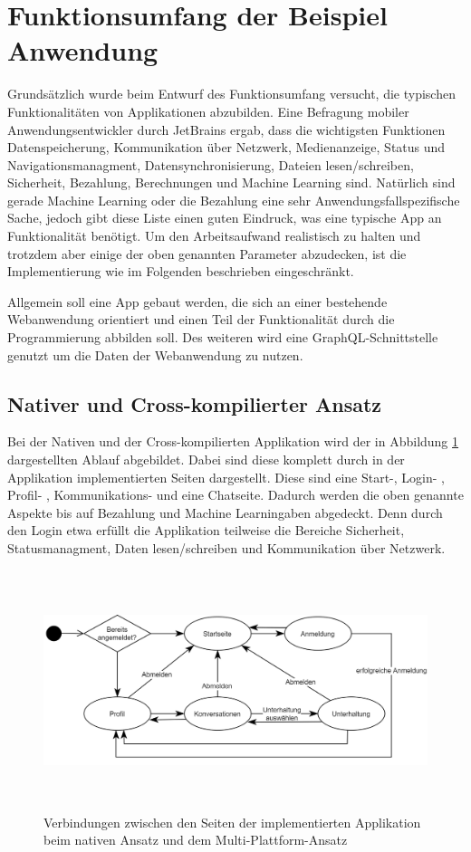 \section{Funktionsumfang der Beispiel Anwendung}
Grundsätzlich wurde beim Entwurf des Funktionsumfang versucht, die typischen Funktionalitäten von Applikationen abzubilden. Eine Befragung mobiler Anwendungsentwickler durch JetBrains ergab, dass die wichtigsten Funktionen Datenspeicherung, Kommunikation über Netzwerk, Medienanzeige, Status und Navigationsmanagment, Datensynchronisierung, Dateien lesen/schreiben, Sicherheit, Bezahlung, Berechnungen und Machine Learning sind\cite{JetBrains_miscellaneous_2021}. Natürlich sind gerade Machine Learning oder die Bezahlung eine sehr Anwendungsfallspezifische Sache, jedoch gibt diese Liste einen guten Eindruck, was eine typische App an Funktionalität benötigt.
Um den Arbeitsaufwand realistisch zu halten und trotzdem aber einige der oben genannten Parameter abzudecken, ist die Implementierung wie im Folgenden beschrieben eingeschränkt.

Allgemein soll eine App gebaut werden, die sich an einer bestehende Webanwendung orientiert und einen Teil der Funktionalität durch die Programmierung abbilden soll. Des weiteren wird eine GraphQL-Schnittstelle genutzt um die Daten der Webanwendung zu nutzen. 

\subsection{Nativer und Cross-kompilierter Ansatz}
Bei der Nativen und der Cross-kompilierten Applikation wird der in Abbildung \ref{fig:pageflow} dargestellten Ablauf abgebildet. Dabei sind diese komplett durch in der Applikation implementierten Seiten dargestellt. Diese sind eine Start-, Login- , Profil- , Kommunikations- und eine Chatseite. Dadurch werden die oben genannte Aspekte bis auf Bezahlung und Machine Learningaben abgedeckt. Denn durch den Login etwa erfüllt die Applikation teilweise die Bereiche Sicherheit, Statusmanagment, Daten lesen/schreiben und Kommunikation über Netzwerk. 

\begin{figure}[ht]
  \centering
  \includegraphics[height=7cm,keepaspectratio]{images/Pageflow_native_flutter.png} 
  \caption{Verbindungen zwischen den Seiten der implementierten Applikation beim nativen Ansatz und dem Multi-Plattform-Ansatz}
  \label{fig:pageflow}
\end{figure}


